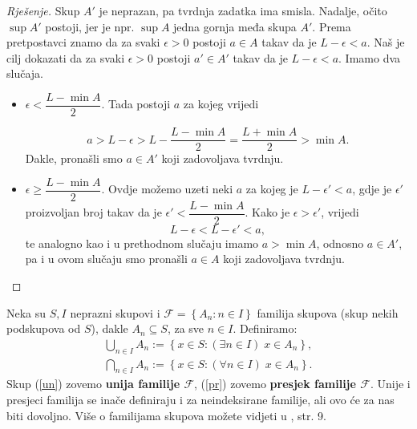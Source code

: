 \begin{proof}[Rješenje]
Skup $A'$ je neprazan, pa tvrdnja zadatka ima smisla. Nadalje, očito $\sup{A'}$ postoji, jer je npr. $\sup{A}$ jedna gornja međa skupa $A'$. Prema pretpostavci znamo da za svaki $\epsilon>0$ postoji $a\in A$ takav da je $L-\epsilon<a$. Naš je cilj dokazati da za svaki $\epsilon>0$ postoji $a'\in A'$ takav da je $L-\epsilon<a$. Imamo dva slučaja.
\begin{itemize}
\item $\epsilon<\dfrac{L-\min{A}}{2}$. Tada postoji $a$ za kojeg vrijedi

$$a>L-\epsilon>L-\dfrac{L-\min{A}}{2}=\dfrac{L+\min{A}}{2}>\min{A}.$$
Dakle, pronašli smo $a\in A'$ koji zadovoljava tvrdnju.
\item $\epsilon\geq \dfrac{L-\min{A}}{2}$. Ovdje možemo uzeti neki $a$ za kojeg je $L-\epsilon'<a$, gdje je $\epsilon'$ proizvoljan broj takav da je $\epsilon'<\dfrac{L-\min{A}}{2}$. Kako je $\epsilon>\epsilon'$, vrijedi
$$L-\epsilon<L-\epsilon'<a,$$
te analogno kao i u prethodnom slučaju imamo $a>\min{A}$, odnosno $a\in A'$, pa i u ovom slučaju smo pronašli $a\in A$ koji zadovoljava tvrdnju. \qedhere
\end{itemize}
\end{proof}
\begin{remark}
\label{unprfam}
Neka su $S,I$ neprazni skupovi i $\mathcal{F}=\left\{A_n : n\in I\right\}$ familija skupova (skup nekih podskupova od $S$), dakle $A_n\subseteq S$, za sve $n\in I$. Definiramo:
\begin{gather}
\label{un}
\bigcup_{n\in I}{A_n}:=\left\{x\in S : (\exists n\in I)\; x\in A_n\right\},\\
\label{pr}
\bigcap_{n\in I}{A_n}:=\left\{x\in S : (\forall n\in I)\; x\in A_n\right\}.
\end{gather}
Skup (\ref{un}) zovemo \textbf{unija familije $\mathcal{F}$}, (\ref{pr}) zovemo \textbf{presjek familije $\mathcal{F}$}. Unije i presjeci familija se inače definiraju i za neindeksirane familije, ali ovo će za nas biti dovoljno. Više o familijama skupova možete vidjeti u \cite{9}, str. 9.
\end{remark}


